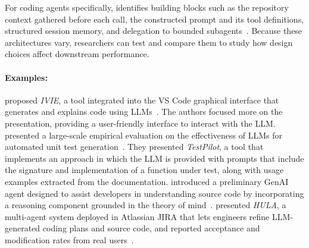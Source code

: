 \documentclass[smallextended]{svjour3}
\newcommand{\studytypeparagraph}[1]{\paragraph{\bfseries #1:}}
\newcommand{\studytypeparagraph}[1]{\subsubsection{#1}}
\begin{document}
For coding agents specifically, \citeauthor{raschka2026components} identifies building blocks such as the repository context gathered before each call, the constructed prompt and its tool definitions, structured session memory, and delegation to bounded subagents~\cite{raschka2026components}.
Because these architectures vary, researchers can test and compare them to study how design choices affect downstream performance.

\studytypeparagraph{Examples}

\citeauthor{DBLP:conf/chi/YanHWH24} proposed \emph{IVIE}, a tool integrated into the VS Code graphical interface that generates and explains code using LLMs~\cite{DBLP:conf/chi/YanHWH24}.
The authors focused more on the presentation, providing a user-friendly interface to interact with the LLM. 
\citeauthor{DBLP:journals/tse/SchaferNET24} presented a large-scale empirical evaluation on the effectiveness of LLMs for automated unit test generation~\cite{DBLP:journals/tse/SchaferNET24}.
They presented \emph{TestPilot}, a tool that implements an approach in which the LLM is provided with prompts that include the signature and implementation of a function under test, along with usage examples extracted from the documentation.
\citeauthor{DBLP:conf/icsm/RichardsW24} introduced a preliminary GenAI agent designed to assist developers in understanding source code by incorporating a reasoning component grounded in the theory of mind~\cite{DBLP:conf/icsm/RichardsW24}.
\citeauthor{DBLP:conf/icse-seip/TakerngsaksiriPTTZJLCCW25} presented \emph{HULA}, a multi-agent system deployed in Atlassian JIRA that lets engineers refine LLM-generated coding plans and source code, and reported acceptance and modification rates from real users~\cite{DBLP:conf/icse-seip/TakerngsaksiriPTTZJLCCW25}.
\space%
\end{document}
